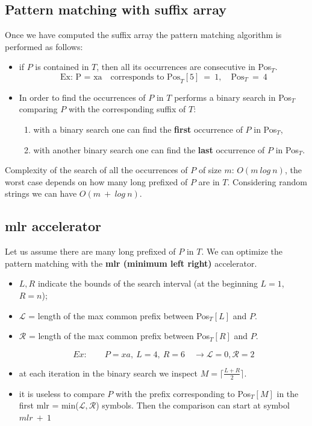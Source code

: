 \subsection{Pattern matching with suffix array}
Once we have computed the suffix array the pattern matching algorithm is performed as follows:
\begin{itemize}
	\item if $P$ is contained in $T$, then all its occurrences are consecutive in Pos$_T$.
	$$\text{Ex:~P~=~xa}\quad \text{corresponds to Pos}_T[5]~=~1,\quad \text{Pos}_T~=~4$$
	\item In order to find the occurrences of $P$ in $T$ performs a binary search in Pos$_T$ comparing $P$ with the corresponding suffix of $T$:
	\begin{enumerate}
		\item with a binary search one can find the \textbf{first} occurrence of $P$ in Pos$_T$,
		\item with another binary search one can find the \textbf{last} occurrence of $P$ in Pos$_T$.
	\end{enumerate}
\end{itemize}
Complexity of the search of all the occurrences of $P$ of size $m$: $O(m~log~n)$, the worst case depends on how many long prefixed of $P$ are in $T$. Considering random strings we can have $O(m~+~log~n)$.
\subsection{mlr accelerator}
Let us assume there are many long prefixed of $P$ in $T$. We can optimize the pattern matching with the \textbf{mlr (minimum left right)} accelerator.
\begin{itemize}
	\item $L,R$ indicate the bounds of the search interval (at the beginning $L= 1$, $R = n$);
	\item $\mathcal{L}$ = length of the max common prefix between Pos$_T[L]$ and $P$.
	\item $\mathcal{R}$ = length of the max common prefix between Pos$_T[R]$ and $P$.
	
	$$Ex:\qquad P = xa,~ L = 4,~ R = 6 \quad \rightarrow \mathcal{L} = 0, \mathcal{R} = 2$$
	\item at each iteration in the binary search we inspect $M = \lceil\frac{L+R}{2}\rceil$.
	\item it is useless to compare $P$ with the prefix corresponding to Pos$_T[M]$ in the first mlr = min($\mathcal{L}, \mathcal{R}$) symbols. Then the comparison can start at symbol $mlr~+~1$
\end{itemize}

